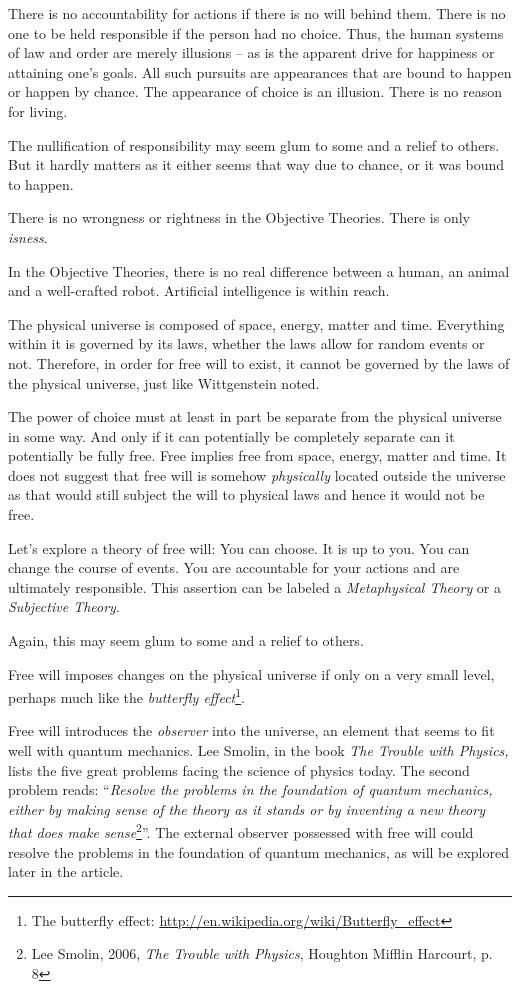 \documentclass[11pt]{article}
\begin{document}
There is no accountability for actions if there is no will behind them. There is
no one to be held responsible if the person had no choice. Thus, the human
systems of law and order are merely illusions -- as is the apparent drive for
happiness or attaining one's goals. All such pursuits are appearances that are
bound to happen or happen by chance. The appearance of choice is an illusion.
There is no reason for living.

The nullification of responsibility may seem glum to some and a relief
to others. But it hardly matters as it either seems that way due to
chance, or it was bound to happen.

There is no wrongness or rightness in the Objective Theories. There is only
{\em isness}.

In the Objective Theories, there is no real difference between a human, an animal
and a well-crafted robot. Artificial intelligence is within reach.

The physical universe is composed of space, energy, matter and time. Everything
within it is governed by its laws, whether the laws allow for random events or
not. Therefore, in order for free will to exist, it cannot be governed by the
laws of the physical universe, just like Wittgenstein noted.

The power of choice must at least in part be separate from the physical universe
in some way. And only if it can potentially be completely separate can it
potentially be fully free. Free implies free from space, energy, matter and
time. It does not suggest that free will is somehow {\em physically} located
outside the universe as that would still subject the will to physical laws and
hence it would not be free.

Let's explore a theory of free will: You can choose. It is up to you. You can
change the course of events. You are accountable for your actions and are
ultimately responsible. This assertion can be labeled a {\em Metaphysical
Theory} or a {\em Subjective Theory}.

Again, this may seem glum to some and a relief to others.

Free will imposes changes on the physical universe if only on a very small
level, perhaps much like the {\em butterfly effect}\footnote{ The butterfly
effect: \url{http://en.wikipedia.org/wiki/Butterfly\_effect}}.

Free will introduces the {\em observer} into the universe, an element that seems
to fit well with quantum mechanics. Lee Smolin, in the book {\em The Trouble
with Physics,} lists the five great problems facing the science of physics
today. The second problem reads: ``{\em Resolve the problems in the foundation
of quantum mechanics, either by making sense of the theory as it stands or by
inventing a new theory that does make sense}\footnote{ Lee Smolin, 2006, {\em The
Trouble with Physics}, Houghton Mifflin Harcourt, p. 8}''. The external observer
possessed with free will could resolve the problems in the foundation of quantum
mechanics, as will be explored later in the article.
\end{document}
